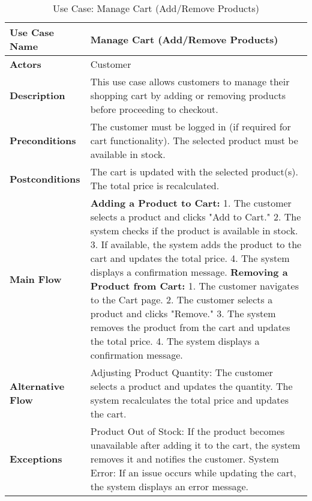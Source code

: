 \begin{table}[h]
\centering
\renewcommand{\arraystretch}{1.2}
\begin{tabular}{|p{3cm}|p{10cm}|}
\hline
\textbf{Use Case Name} & Manage Cart (Add/Remove Products) \\
\hline
\textbf{Actors} & Customer \\
\hline
\textbf{Description} & This use case allows customers to manage their shopping cart by adding or removing products before proceeding to checkout. \\
\hline
\textbf{Preconditions} & The customer must be logged in (if required for cart functionality). The selected product must be available in stock. \\
\hline
\textbf{Postconditions} & The cart is updated with the selected product(s). The total price is recalculated. \\
\hline
\textbf{Main Flow} & \textbf{Adding a Product to Cart:}
1. The customer selects a product and clicks "Add to Cart."
2. The system checks if the product is available in stock.
3. If available, the system adds the product to the cart and updates the total price.
4. The system displays a confirmation message.
\textbf{Removing a Product from Cart:}
1. The customer navigates to the Cart page.
2. The customer selects a product and clicks "Remove."
3. The system removes the product from the cart and updates the total price.
4. The system displays a confirmation message. \\
\hline
\textbf{Alternative Flow} & Adjusting Product Quantity: The customer selects a product and updates the quantity. The system recalculates the total price and updates the cart. \\
\hline
\textbf{Exceptions} & Product Out of Stock: If the product becomes unavailable after adding it to the cart, the system removes it and notifies the customer. System Error: If an issue occurs while updating the cart, the system displays an error message. \\
\hline
\end{tabular}
\caption{Use Case: Manage Cart (Add/Remove Products)}
\end{table}

